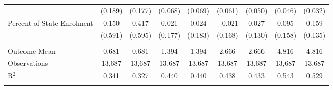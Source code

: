 \begin{tabular}{@{\extracolsep{5pt}}lcccccccc}
  & (0.189) & (0.177) & (0.068) & (0.069) & (0.061) & (0.050) & (0.046) & (0.032) \\ 
  Percent of State Enrolment & 0.150 & 0.417 & 0.021 & 0.024 & $-$0.021 & 0.027 & 0.095 & 0.159 \\ 
  & (0.591) & (0.595) & (0.177) & (0.183) & (0.168) & (0.130) & (0.158) & (0.135) \\ 
 \hline \\[-1.8ex] 
Outcome Mean & 0.681 & 0.681 & 1.394 & 1.394 & 2.666 & 2.666 & 4.816 & 4.816 \\ 
Observations & 13,687 & 13,687 & 13,687 & 13,687 & 13,687 & 13,687 & 13,687 & 13,687 \\ 
R$^{2}$ & 0.341 & 0.327 & 0.440 & 0.440 & 0.438 & 0.433 & 0.543 & 0.529 \\ 
\hline 
\hline \\[-1.8ex] 
\end{tabular} 
